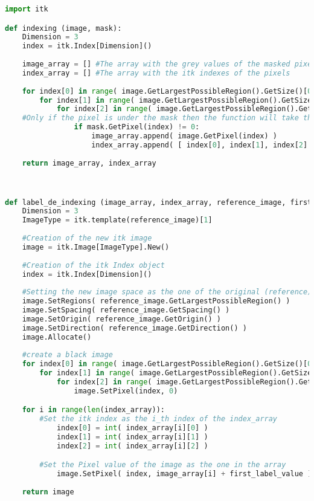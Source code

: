 \documentclass{standalone}
\begin{document}
\lstset{style=python}
	\begin{lstlisting}[language=python, caption = Indexing functions, label=indexing]
import itk

def indexing (image, mask):
    Dimension = 3
    index = itk.Index[Dimension]()
    
    image_array = [] #The array with the grey values of the masked pixels
    index_array = [] #The array with the itk indexes of the pixels
    
    for index[0] in range( image.GetLargestPossibleRegion().GetSize()[0] ):
        for index[1] in range( image.GetLargestPossibleRegion().GetSize()[1] ):
            for index[2] in range( image.GetLargestPossibleRegion().GetSize()[2] ):
    #Only if the pixel is under the mask then the function will take that pixel
                if mask.GetPixel(index) != 0:
                    image_array.append( image.GetPixel(index) )
                    index_array.append( [ index[0], index[1], index[2] ] )
                
    return image_array, index_array



def label_de_indexing (image_array, index_array, reference_image, first_label_value = 0 ):
    Dimension = 3
    ImageType = itk.template(reference_image)[1]
    
    #Creation of the new itk image
    image = itk.Image[ImageType].New()
    
    #Creation of the itk Index object
    index = itk.Index[Dimension]()
    
    #Setting the new image space as the one of the original (reference) image.
    image.SetRegions( reference_image.GetLargestPossibleRegion() )
    image.SetSpacing( reference_image.GetSpacing() )
    image.SetOrigin( reference_image.GetOrigin() )
    image.SetDirection( reference_image.GetDirection() )
    image.Allocate()
    
    #create a black image
    for index[0] in range( image.GetLargestPossibleRegion().GetSize()[0] ):
        for index[1] in range( image.GetLargestPossibleRegion().GetSize()[1] ):
            for index[2] in range( image.GetLargestPossibleRegion().GetSize()[2] ):
                image.SetPixel(index, 0)

    for i in range(len(index_array)):
        #Set the itk index as the i_th index of the index_array
            index[0] = int( index_array[i][0] )
            index[1] = int( index_array[i][1] )
            index[2] = int( index_array[i][2] )

        #Set the Pixel value of the image as the one in the array
            image.SetPixel( index, image_array[i] + first_label_value ) 
           
    return image
\end{lstlisting}
\end{document}
